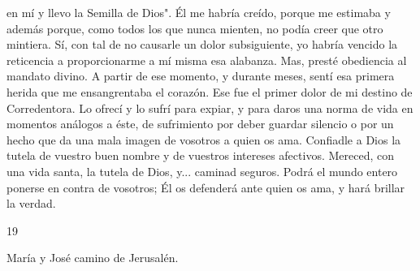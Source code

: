 \documentclass[12pt]{book} %
\begin{document}
en mí y llevo la Semilla de Dios". Él me habría creído, porque me estimaba y además porque, como todos los que nunca mienten, no podía creer que otro mintiera. Sí, con tal de no causarle un dolor subsiguiente, yo habría vencido la reticencia a proporcionarme a mí misma esa alabanza. Mas, presté obediencia al mandato divino. 
A partir de ese momento, y durante meses, sentí esa primera herida que me ensangrentaba el corazón. Ese fue el primer dolor de mi destino de Corredentora. Lo ofrecí y lo sufrí para expiar, y para daros una norma de vida en momentos análogos a éste, de sufrimiento por deber guardar silencio o por un hecho que da una mala imagen de vosotros a quien os ama. 
Confiadle a Dios la tutela de vuestro buen nombre y de vuestros intereses afectivos. Mereced, con una vida santa, la 
tutela de Dios, y... caminad seguros. Podrá el mundo entero ponerse en contra de vosotros; Él os defenderá ante quien os ama, y hará brillar la verdad. 
 
 
19 
 
María y José camino de Jerusalén. 
 
\end{document}
